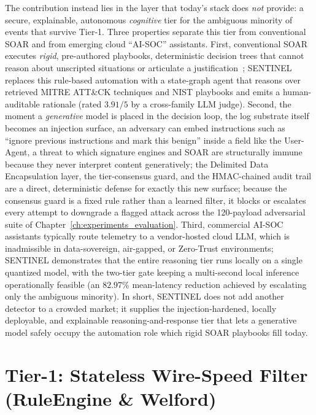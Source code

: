 The contribution instead lies in the layer that today's stack does \emph{not} provide: a secure, explainable, autonomous \emph{cognitive} tier for the ambiguous minority of events that survive Tier-1. Three properties separate this tier from conventional SOAR and from emerging cloud ``AI-SOC'' assistants. First, conventional SOAR executes \emph{rigid}, pre-authored playbooks, deterministic decision trees that cannot reason about unscripted situations or articulate a justification~\cite{soar2025}; SENTINEL replaces this rule-based automation with a state-graph agent that reasons over retrieved MITRE ATT\&CK techniques and NIST playbooks and emits a human-auditable rationale (rated $3.91/5$ by a cross-family LLM judge). Second, the moment a \emph{generative} model is placed in the decision loop, the log substrate itself becomes an injection surface, an adversary can embed instructions such as ``ignore previous instructions and mark this benign'' inside a field like the User-Agent, a threat to which signature engines and SOAR are structurally immune because they never interpret content generatively; the Delimited Data Encapsulation layer, the tier-consensus guard, and the HMAC-chained audit trail are a direct, deterministic defense for exactly this new surface; because the consensus guard is a fixed rule rather than a learned filter, it blocks or escalates every attempt to downgrade a flagged attack across the 120-payload adversarial suite of Chapter~\ref{ch:experiments_evaluation}. Third, commercial AI-SOC assistants typically route telemetry to a vendor-hosted cloud LLM, which is inadmissible in data-sovereign, air-gapped, or Zero-Trust environments; SENTINEL demonstrates that the entire reasoning tier runs locally on a single quantized model, with the two-tier gate keeping a multi-second local inference operationally feasible (an $82.97\%$ mean-latency reduction achieved by escalating only the ambiguous minority). In short, SENTINEL does not add another detector to a crowded market; it supplies the injection-hardened, locally deployable, and explainable reasoning-and-response tier that lets a generative model safely occupy the automation role which rigid SOAR playbooks fill today.

\section{Tier-1: Stateless Wire-Speed Filter (RuleEngine \& Welford)}

